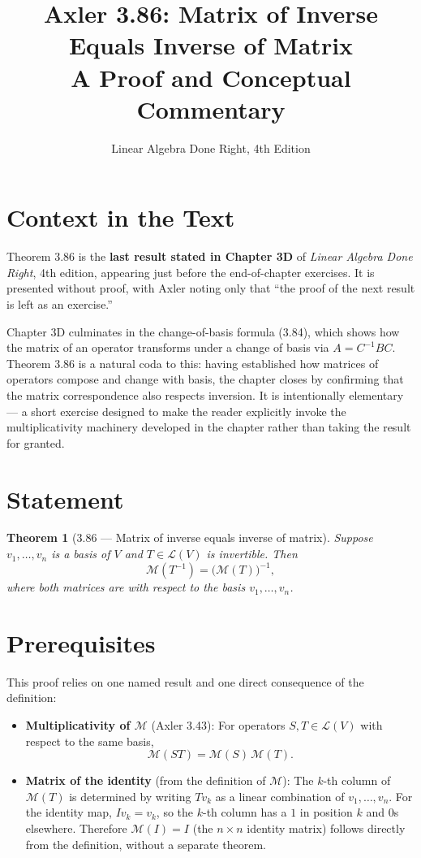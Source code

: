 \documentclass[12pt]{article}
\title{\textbf{Axler 3.86: Matrix of Inverse Equals Inverse of Matrix}\\
\large A Proof and Conceptual Commentary}
\author{Linear Algebra Done Right, 4th Edition}
\date{}
\newtheorem{theorem}{Theorem}[section]
\theoremstyle{definition}
\theoremstyle{remark}
\newcommand{\M}[1]{\mathcal{M}\!\left(#1\right)}
\begin{document}
 
\maketitle
 
\section*{Context in the Text}
 
Theorem 3.86 is the \textbf{last result stated in Chapter 3D} of \emph{Linear Algebra Done Right}, 4th edition, appearing just before
the end-of-chapter exercises. It is presented without proof, with Axler noting
only that ``the proof of the next result is left as an exercise.''
 
Chapter 3D culminates in the change-of-basis formula (3.84), which shows how
the matrix of an operator transforms under a change of basis via
$A = C^{-1}BC$. Theorem 3.86 is a natural coda to this: having established how
matrices of operators compose and change with basis, the chapter closes by
confirming that the matrix correspondence also respects inversion. It is
intentionally elementary --- a short exercise designed to make the reader
explicitly invoke the multiplicativity machinery developed in the chapter rather
than taking the result for granted.
 
\section*{Statement}
 
\begin{theorem}[3.86 --- Matrix of inverse equals inverse of matrix]
Suppose $v_1, \ldots, v_n$ is a basis of $V$ and $T \in \mathcal{L}(V)$ is
invertible. Then
\[
    \M{T^{-1}} = \bigl(\M{T}\bigr)^{-1},
\]
where both matrices are with respect to the basis $v_1, \ldots, v_n$.
\end{theorem}
 
\section*{Prerequisites}
 
This proof relies on one named result and one direct consequence of the definition:
 
\begin{itemize}
    \item \textbf{Multiplicativity of $\mathcal{M}$} (Axler 3.43): For operators
          $S, T \in \mathcal{L}(V)$ with respect to the same basis,
          \[
              \M{ST} = \M{S}\,\M{T}.
          \]
 
    \item \textbf{Matrix of the identity} (from the definition of $\mathcal{M}$):
          The $k$-th column of $\mathcal{M}(T)$ is determined by writing $Tv_k$
          as a linear combination of $v_1, \ldots, v_n$. For the identity map,
          $Iv_k = v_k$, so the $k$-th column has a $1$ in position $k$ and $0$s
          elsewhere. Therefore $\mathcal{M}(I) = I$ (the $n \times n$ identity
          matrix) follows directly from the definition, without a separate theorem.
\end{itemize}
 
\end{document}
